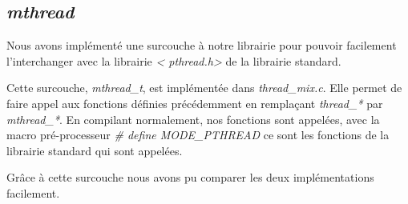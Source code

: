 \subsection{\textit{mthread}}
Nous avons implémenté une surcouche à notre librairie pour pouvoir
facilement l'interchanger avec la librairie \textit{\textless
  pthread.h\textgreater} de la librairie standard.

Cette surcouche, \textit{mthread\_t}, est implémentée dans
\textit{thread\_mix.c}.  Elle permet de faire appel aux fonctions
définies précédemment en remplaçant \textit{thread\_*} par
\textit{mthread\_*}. En compilant normalement, nos fonctions sont
appelées, avec la macro pré-processeur \textit{\# define
  MODE\_PTHREAD} ce sont les fonctions de la librairie standard qui
sont appelées.

Grâce à cette surcouche nous avons pu comparer les deux
implémentations facilement.

